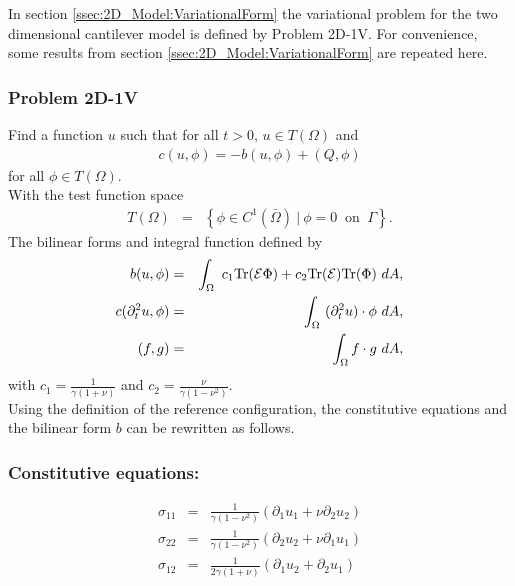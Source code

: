 \documentclass[../../main.tex]{subfiles}
\begin{document}
In section \ref{ssec:2D_Model:VariationalForm} the variational problem for the two dimensional cantilever model is defined by Problem 2D-1V. For convenience, some results from section \ref{ssec:2D_Model:VariationalForm} are repeated here.

\subsubsection{Problem 2D-1V}\label{sssec:2D_Model:Problem2D1VChp5}
Find a function $u$ such that for all $t>0$, $u \in T(\Omega)$ and 
\begin{align}
	c(u,\phi) = -b(u,\phi) + (Q,\phi) \label{eq:2D_Model:Problem2D1VEqChp5}
\end{align}
for all $\phi \in T(\Omega)$.\\

With the test function space 
\begin{eqnarray*}
	T(\Omega) & = & \left\{ \phi \in C^1(\bar{\Omega}) \ | \ \phi = 0 \ \textrm{ on } \ \Gamma \right\}.
\end{eqnarray*}
The bilinear forms and integral function defined by
\begin{eqnarray}
	b(u,\phi) & = & \int_\Omega~c_1\textrm{Tr}({\cal E}\Phi)+ c_2\textrm{Tr}({\cal E})
	\textrm{Tr}(\Phi) ~dA, \label{eq:2D_Model:BilinearChp5}\\
	c(\partial_t^2 u,\phi) & = & \int_\Omega~ (\partial^2_t u) \cdot \phi~dA, \label{eq:2D_Model:Bilinear_cChp5}\\
	(f,g) &=& \int_{\Omega} f\cdot g \ dA, \label{eq:2D_Model:Bilinear_intChp5}
\end{eqnarray}
with $\displaystyle c_1 = \frac{1}{\gamma(1+\nu)}$ and $\displaystyle c_2 = \frac{\nu}{\gamma(1-\nu^2)}$.\\

Using the definition of the reference configuration, the constitutive equations and the bilinear form $b$ can be rewritten as follows.

\subsubsection{Constitutive equations:}
\begin{eqnarray}
	\sigma_{11} & = & \frac{1}{\gamma(1-\nu^2)}(\partial_1 u_1 + \nu \partial_2 u_2) \label{CE1} \\
	\sigma_{22} & = & \frac{1}{\gamma(1-\nu^2)}(\partial_2 u_2 + \nu \partial_1 u_1) \label{CE2} \\
	\sigma_{12} & = & \frac{1}{2\gamma(1+\nu)}(\partial_1 u_2 + \partial_2 u_1) \label{CE3}
\end{eqnarray}
\end{document}
